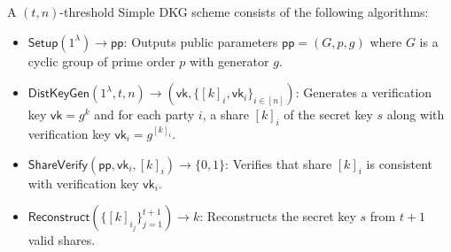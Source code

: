 \begin{definition}
A $(t,n)$-threshold Simple DKG scheme consists of the following algorithms:
\begin{itemize}
\item $\mathsf{Setup}(1^{\lambda}) \to \mathsf{pp}$: Outputs public parameters $\mathsf{pp} = (G, p, g)$ where $G$ is a cyclic group of prime order $p$ with generator $g$.
\item $\mathsf{DistKeyGen}(1^{\lambda}, t, n) \to (\mathsf{vk}, \{[k]_i, \mathsf{vk}_i\}_{i \in [n]})$: Generates a verification key $\mathsf{vk} = g^k$ and for each party $i$, a share $[k]_i$ of the secret key $s$ along with verification key $\mathsf{vk}_i = g^{[k]_i}$.
\item $\mathsf{ShareVerify}(\mathsf{pp}, \mathsf{vk}_i, [k]_i) \to \{0,1\}$: Verifies that share $[k]_i$ is consistent with verification key $\mathsf{vk}_i$.
\item $\mathsf{Reconstruct}(\{[k]_{i_j}\}_{j=1}^{t+1}) \to k$: Reconstructs the secret key $s$ from $t+1$ valid shares.
\end{itemize}
\end{definition}



